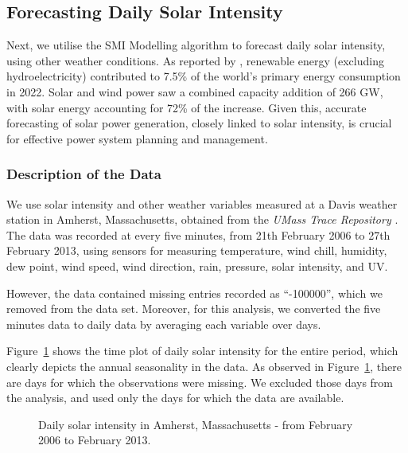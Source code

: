 \documentclass[
  11pt,
  a4paper,
]{article}
\begin{document}
\subsection{Forecasting Daily Solar Intensity}\label{sec-solar}

Next, we utilise the SMI Modelling algorithm to forecast daily solar
intensity, using other weather conditions. As reported by
\textcite{EI2023}, renewable energy (excluding hydroelectricity)
contributed to 7.5\% of the world's primary energy consumption in 2022.
Solar and wind power saw a combined capacity addition of 266 GW, with
solar energy accounting for 72\% of the increase. Given this, accurate
forecasting of solar power generation, closely linked to solar
intensity, is crucial for effective power system planning and
management.

\subsubsection{Description of the Data}\label{description-of-the-data-1}

We use solar intensity and other weather variables measured at a Davis
weather station in Amherst, Massachusetts, obtained from the \emph{UMass
Trace Repository} \autocite{Umass2023}. The data was recorded at every
five minutes, from 21th February 2006 to 27th February 2013, using
sensors for measuring temperature, wind chill, humidity, dew point, wind
speed, wind direction, rain, pressure, solar intensity, and UV.

However, the data contained missing entries recorded as ``-100000'',
which we removed from the data set. Moreover, for this analysis, we
converted the five minutes data to daily data by averaging each variable
over days.

Figure~\ref{fig-solar} shows the time plot of daily solar intensity for
the entire period, which clearly depicts the annual seasonality in the
data. As observed in Figure~\ref{fig-solar}, there are days for which
the observations were missing. We excluded those days from the analysis,
and used only the days for which the data are available.

\begin{figure}


\caption{\label{fig-solar}Daily solar intensity in Amherst,
Massachusetts - from February 2006 to February 2013.}

\end{figure}%
\end{document}
